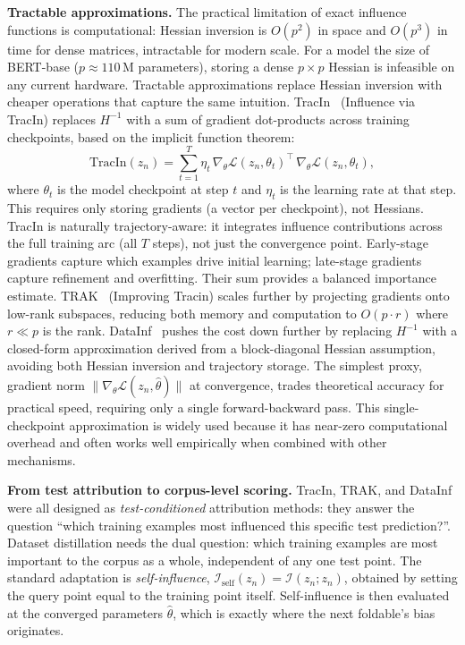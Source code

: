 \documentclass[12pt, a4paper, twoside]{book}
\numberwithin{equation}{chapter}
\theoremstyle{plain}
\theoremstyle{definition}
\theoremstyle{remark}
\newenvironment{foldable}{}{}
\begin{document}
\begin{foldable}
  \textbf{Tractable approximations.}
  The practical limitation of exact influence functions is computational: Hessian inversion is $O(p^2)$ in space and $O(p^3)$ in time for dense matrices, intractable for modern scale.
  For a model the size of BERT-base ($p \approx 110$\,M parameters), storing a dense $p \times p$ Hessian is infeasible on any current hardware.
  Tractable approximations replace Hessian inversion with cheaper operations that capture the same intuition.
  TracIn~\cite{pruthi2020estimating} (Influence via TracIn) replaces $H^{-1}$ with a sum of gradient dot-products across training checkpoints, based on the implicit function theorem:
  \begin{equation}
    \text{TracIn}(z_n) = \sum_{t=1}^{T} \eta_t \,
    \nabla_\theta \mathcal{L}(z_n, \theta_t)^\top \,
    \nabla_\theta \mathcal{L}(z_n, \theta_t),
    \label{eq:tracin}
  \end{equation}
  where $\theta_t$ is the model checkpoint at step $t$ and $\eta_t$ is the learning rate at that step.
  This requires only storing gradients (a vector per checkpoint), not Hessians.
  TracIn is naturally trajectory-aware: it integrates influence contributions across the full training arc (all $T$ steps), not just the convergence point.
  Early-stage gradients capture which examples drive initial learning; late-stage gradients capture refinement and overfitting.
  Their sum provides a balanced importance estimate.
  TRAK~\cite{park2023trak} (Improving Tracin) scales further by projecting gradients onto low-rank subspaces, reducing both memory and computation to $O(p \cdot r)$ where $r \ll p$ is the rank.
  DataInf~\cite{kwon2023datainf} pushes the cost down further by replacing $H^{-1}$ with a closed-form approximation derived from a block-diagonal Hessian assumption, avoiding both Hessian inversion and trajectory storage.
  The simplest proxy, gradient norm $\|\nabla_\theta \mathcal{L}(z_n, \hat\theta)\|$ at convergence, trades theoretical accuracy for practical speed, requiring only a single forward-backward pass.
  This single-checkpoint approximation is widely used because it has near-zero computational overhead and often works well empirically when combined with other mechanisms.
\end{foldable}

\begin{foldable}
  \textbf{From test attribution to corpus-level scoring.}
  TracIn, TRAK, and DataInf were all designed as \textit{test-conditioned} attribution methods: they answer the question ``which training examples most influenced this specific test prediction?''.
  Dataset distillation needs the dual question: which training examples are most important to the corpus as a whole, independent of any one test point.
  The standard adaptation is \textit{self-influence}, $\mathcal{I}_\text{self}(z_n) = \mathcal{I}(z_n; z_n)$, obtained by setting the query point equal to the training point itself.
  Self-influence is then evaluated at the converged parameters $\hat\theta$, which is exactly where the next foldable's bias originates.
\end{foldable}
\end{document}
